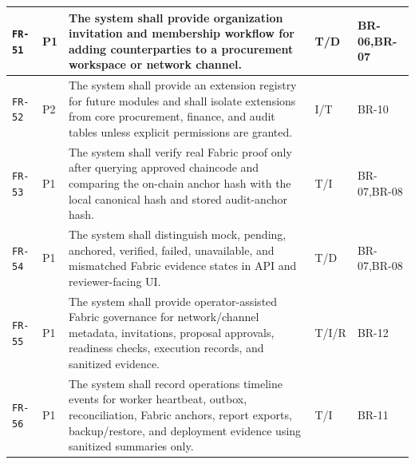 \documentclass[11pt,a4paper]{article}
\begin{document}
\begin{footnotesize}
\begin{longtable}{@{}p{}p{}p{}p{}p{}@{}}
\texttt{FR-51} & P1 & The system shall provide organization invitation and membership workflow for adding counterparties to a procurement workspace or network channel. & T/D & BR-06,BR-07 \\ \hline
\texttt{FR-52} & P2 & The system shall provide an extension registry for future modules and shall isolate extensions from core procurement, finance, and audit tables unless explicit permissions are granted. & I/T & BR-10 \\ \hline
\texttt{FR-53} & P1 & The system shall verify real Fabric proof only after querying approved chaincode and comparing the on-chain anchor hash with the local canonical hash and stored audit-anchor hash. & T/I & BR-07,BR-08 \\ \hline
\texttt{FR-54} & P1 & The system shall distinguish mock, pending, anchored, verified, failed, unavailable, and mismatched Fabric evidence states in API and reviewer-facing UI. & T/D & BR-07,BR-08 \\ \hline
\texttt{FR-55} & P1 & The system shall provide operator-assisted Fabric governance for network/channel metadata, invitations, proposal approvals, readiness checks, execution records, and sanitized evidence. & T/I/R & BR-12 \\ \hline
\texttt{FR-56} & P1 & The system shall record operations timeline events for worker heartbeat, outbox, reconciliation, Fabric anchors, report exports, backup/restore, and deployment evidence using sanitized summaries only. & T/I & BR-11 \\ \hline
\end{longtable}
\end{footnotesize}
\end{document}

